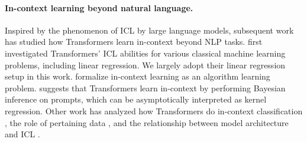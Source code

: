 \paragraph{In-context learning beyond natural language. }
Inspired by the phenomenon of ICL by large language models, subsequent work has studied how Transformers learn in-context beyond NLP tasks.
\citet{Garg2022WhatCT} first investigated Transformers' ICL abilities for various classical machine learning problems, including linear regression. 
We largely adopt their linear regression setup in this work.
\citet{Li2023TransformersAA} formalize in-context learning as an algorithm learning problem.
\citet{han2023incontext} suggests that Transformers learn in-context by performing Bayesian inference on prompts, which can be asymptotically interpreted as kernel regression. 
Other work has analyzed how Transformers do in-context classification \citep{AtaeeTarzanagh2023TransformersAS,tarzanagh2023maxmargin,Zhang2023TrainedTL}, the role of pertaining data \citep{raventós2023pretraining}, and the relationship between model architecture and ICL \citep{lee2023exploring}.


